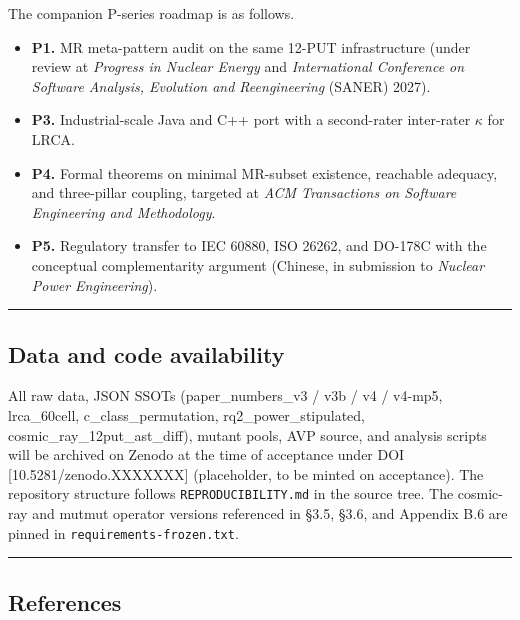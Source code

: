 \documentclass[review,12pt,authoryear]{elsarticle}
\providecommand{\tightlist}{\setlength{\itemsep}{0pt}\setlength{\parskip}{0pt}}
\begin{document}
The companion P-series roadmap is as follows.

\begin{itemize}
\tightlist
\item
  \textbf{P1.} MR meta-pattern audit on the same 12-PUT infrastructure
  (under review at \emph{Progress in Nuclear Energy} and
  \emph{International Conference on Software Analysis, Evolution and
  Reengineering} (SANER) 2027).
\item
  \textbf{P3.} Industrial-scale Java and C++ port with a second-rater
  inter-rater $\kappa$ for LRCA.
\item
  \textbf{P4.} Formal theorems on minimal MR-subset existence, reachable
  adequacy, and three-pillar coupling, targeted at \emph{ACM
  Transactions on Software Engineering and Methodology}.
\item
  \textbf{P5.} Regulatory transfer to IEC 60880, ISO 26262, and DO-178C
  with the conceptual complementarity argument (Chinese, in submission
  to \emph{Nuclear Power Engineering}).
\end{itemize}

\begin{center}\rule{0.5\linewidth}{0.5pt}\end{center}

\subsection{Data and code
availability}\label{data-and-code-availability}

All raw data, JSON SSOTs (paper\_numbers\_v3 / v3b / v4 / v4-mp5,
lrca\_60cell, c\_class\_permutation, rq2\_power\_stipulated,
cosmic\_ray\_12put\_ast\_diff), mutant pools, AVP source, and analysis
scripts will be archived on Zenodo at the time of acceptance under DOI
{[}10.5281/zenodo.XXXXXXX{]} (placeholder, to be minted on acceptance).
The repository structure follows \texttt{REPRODUCIBILITY.md} in the
source tree. The cosmic-ray and mutmut operator versions referenced in
§3.5, §3.6, and Appendix B.6 are pinned in
\texttt{requirements-frozen.txt}.

\begin{center}\rule{0.5\linewidth}{0.5pt}\end{center}

\subsection{References}\label{references}
\end{document}
